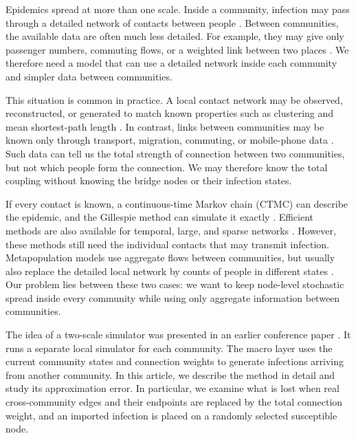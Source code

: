 \documentclass[a4paper,fleqn]{cas-sc}
\begin{document}
Epidemics spread at more than one scale. Inside a community, infection may pass through a detailed network of contacts between people \citep{keeling2005,pastorsatorras2015,kiss2017}. Between communities, the available data are often much less detailed. For example, they may give only passenger numbers, commuting flows, or a weighted link between two places \citep{balcan2009,barbosa2018human}. We therefore need a model that can use a detailed network inside each community and simpler data between communities.

This situation is common in practice. A local contact network may be observed, reconstructed, or generated to match known properties such as clustering and mean shortest-path length \citep{eubank2004,danon2011}. In contrast, links between communities may be known only through transport, migration, commuting, or mobile-phone data \citep{barbosa2018human,chang2021}. Such data can tell us the total strength of connection between two communities, but not which people form the connection. We may therefore know the total coupling without knowing the bridge nodes or their infection states.

If every contact is known, a continuous-time Markov chain (CTMC) can describe the epidemic, and the Gillespie method can simulate it exactly \citep{gillespie1977exact,gibson2000}. Efficient methods are also available for temporal, large, and sparse networks \citep{vestergaard2015,kuryliak2025simulating}. However, these methods still need the individual contacts that may transmit infection. Metapopulation models use aggregate flows between communities, but usually also replace the detailed local network by counts of people in different states \citep{colizza2007reaction,colizza2008,balcan2010modeling,ajelli2010}. Our problem lies between these two cases: we want to keep node-level stochastic spread inside every community while using only aggregate information between communities.

The idea of a two-scale simulator was presented in an earlier conference paper \citep{kuryliak2025towards}. It runs a separate local simulator for each community. The macro layer uses the current community states and connection weights to generate infections arriving from another community. In this article, we describe the method in detail and study its approximation error. In particular, we examine what is lost when real cross-community edges and their endpoints are replaced by the total connection weight, and an imported infection is placed on a randomly selected susceptible node.
\end{document}
